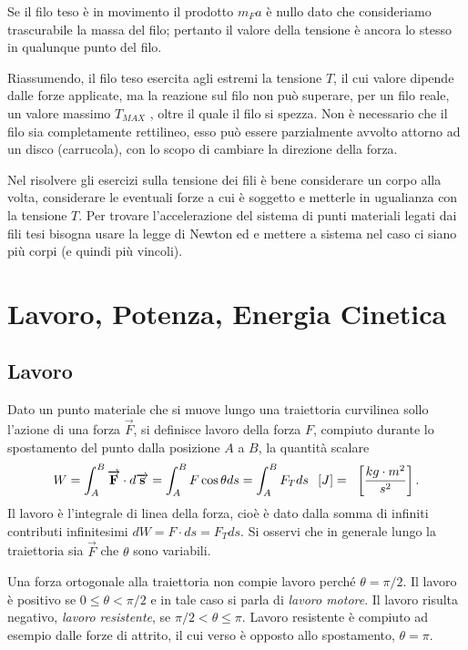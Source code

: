 \documentclass[class=book, crop=false, oneside, 12pt]{standalone}
\begin{document}
Se il filo teso è in movimento il prodotto \(m_F a\) è nullo dato che consideriamo trascurabile la massa del filo; pertanto il valore della tensione è ancora lo stesso in qualunque punto del filo.

Riassumendo, il filo teso esercita agli estremi la tensione \(T\), il cui valore dipende dalle forze applicate, ma la reazione sul filo non può superare, per un filo reale, un valore massimo \(T_{MAX}\) , oltre il quale il filo si spezza.\newline
Non è necessario che il filo sia completamente rettilineo, esso può essere parzialmente avvolto attorno ad un disco (carrucola), con lo scopo di cambiare la direzione della forza. 

Nel risolvere gli esercizi sulla tensione dei fili è bene considerare un corpo alla volta, considerare le eventuali forze a cui è soggetto e metterle in ugualianza con la tensione \(T\).
Per trovare l'accelerazione del sistema di punti materiali legati dai fili tesi bisogna usare la legge di Newton ed e mettere a sistema nel caso ci siano più corpi (e quindi più vincoli).

\section{Lavoro, Potenza, Energia Cinetica}

\subsection{Lavoro}

Dato un punto materiale che si muove lungo una traiettoria curvilinea sollo l'azione di una forza \(\overrightarrow{F}\), si definisce lavoro della forza \(F\), compiuto durante lo spostamento del punto dalla posizione \(A\) a \(B\), la quantità scalare
\begin{equation}
    W = \int_A^B \overrightarrow{F} \cdot d \overrightarrow{s} = \int_A^B F \cos \theta ds = \int_A^B F_T ds \udm{J} = \udm{\frac{kg \cdot m^2}{s^2}}. 
\end{equation} 
Il lavoro è l'integrale di linea della forza, cioè è dato dalla somma di infiniti contributi infinitesimi \(d W = F \cdot d s = F_T d s\).
Si osservi che in generale lungo la traiettoria sia \(\overrightarrow{F}\) che \(\theta\) sono variabili.

Una forza ortogonale alla traiettoria non compie lavoro perché \(\theta = \pi / 2 \). Il lavoro è positivo se \(0 \leq \theta < \pi / 2\) e in tale caso si parla di \emph{lavoro motore}. 
Il lavoro risulta negativo, \emph{lavoro resistente}, se \(\pi / 2 < \theta \leq \pi \). Lavoro resistente è compiuto ad esempio dalle forze di attrito, il cui verso è opposto allo spostamento, \(\theta = \pi\). 
\end{document}
